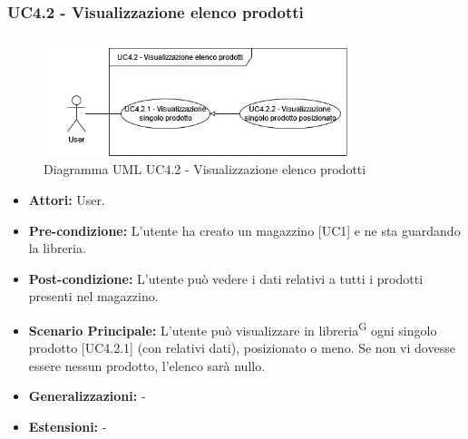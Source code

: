 \subsubsection{UC4.2 - Visualizzazione elenco prodotti}
\begin{figure}[H]
  \centering
  \includegraphics[width=0.8\textwidth]{UC_diagrams_1-10/UC4.2.drawio.png}
   \caption{Diagramma UML UC4.2 - Visualizzazione elenco prodotti}
\end{figure}
\begin{itemize}
    \item \textbf{Attori:} User.
    \item \textbf{Pre-condizione:}  L'utente ha creato un magazzino [UC1] e ne sta guardando la libreria.
    \item \textbf{Post-condizione:} L'utente può vedere i dati relativi a tutti i prodotti presenti nel magazzino.
    \item \textbf{Scenario Principale:} L'utente può visualizzare in libreria\textsuperscript{G} ogni singolo prodotto [UC4.2.1] (con relativi dati), posizionato o meno. Se non vi dovesse essere nessun prodotto, l'elenco sarà nullo.
    \item \textbf{Generalizzazioni:} -
    \item \textbf{Estensioni:} -
\end{itemize}


